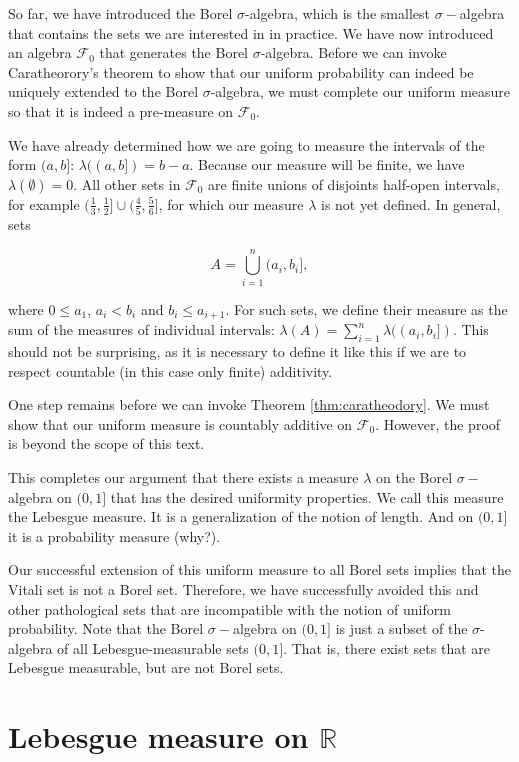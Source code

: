 \documentclass{book}
\theoremstyle{plain}%
\theoremstyle{definition}
\begin{document}
So far, we have introduced the Borel $\sigma$-algebra, which is the smallest $\sigma-$algebra that contains the sets we are interested in in practice. We have now introduced an algebra $\mathcal{F}_0$ that generates the Borel $\sigma$-algebra. Before we can invoke Caratheorory's theorem to show that our uniform probability can indeed be uniquely extended to the Borel $\sigma$-algebra, we must complete our uniform measure so that it is indeed a pre-measure on $\mathcal{F}_0$.

We have already determined how we are going to measure the intervals of the form $(a, b]$: $\lambda((a, b]) = b - a$. Because our measure will be finite, we have $\lambda(\emptyset) = 0$. All other sets in $\mathcal{F}_0$ are finite unions of disjoints half-open intervals, for example $(\frac{1}{3}, \frac{1}{2}] \cup (\frac{4}{5}, \frac{5}{6}]$, for which our measure $\lambda$ is not yet defined. In general, sets

$$A = \bigcup_{i=1}^n (a_i, b_i],$$

where $0 \leq a_1$, $a_i < b_i$ and $b_i \leq a_{i+1}$. For such sets, we define their measure as the sum of the measures of individual intervals: $\lambda(A) = \sum_{i=1}^n \lambda((a_i, b_i])$. This should not be surprising, as it is necessary to define it like this if we are to respect countable (in this case only finite) additivity.

One step remains before we can invoke Theorem \ref{thm:caratheodory}. We must show that our uniform measure is countably additive on $\mathcal{F}_0$. However, the proof is beyond the scope of this text.

This completes our argument that there exists a measure $\lambda$ on the Borel $\sigma-$algebra on $(0,1]$ that has the desired uniformity properties. We call this measure the Lebesgue measure. It is a generalization of the notion of length. And on $(0, 1]$ it is a probability measure (why?).

Our successful extension of this uniform measure to all Borel sets implies that the Vitali set is not a Borel set. Therefore, we have successfully avoided this and other pathological sets that are incompatible with the notion of uniform probability. Note that the Borel $\sigma-$algebra on $(0,1]$ is just a subset of the $\sigma$-algebra of all Lebesgue-measurable sets $(0,1]$. That is, there exist sets that are Lebesgue measurable, but are not Borel sets.

\section{Lebesgue measure on $\mathbb{R}$}
\end{document}

